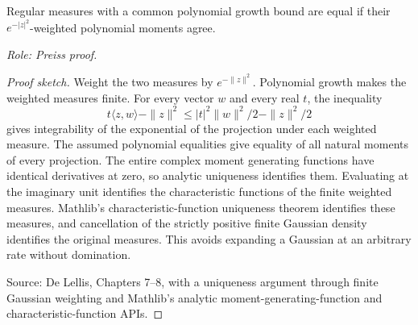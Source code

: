 \begin{lemma}
\label{lem:moment-determination}
Regular measures with a common polynomial growth bound are equal if their
$e^{-|z|^2}$-weighted polynomial moments agree.
\par\emph{Role: Preiss proof.}
\end{lemma}
\begin{proof}[Proof sketch]
Weight the two measures by $e^{-\|z\|^2}$. Polynomial growth makes the weighted measures finite. For every vector $w$ and every real $t$, the inequality
\[
t\langle z,w\rangle-\|z\|^2\leq |t|^2\|w\|^2/2-\|z\|^2/2
\]
gives integrability of the exponential of the projection under each weighted measure. The assumed polynomial equalities give equality of all natural moments of every projection. The entire complex moment generating functions have identical derivatives at zero, so analytic uniqueness identifies them. Evaluating at the imaginary unit identifies the characteristic functions of the finite weighted measures. Mathlib's characteristic-function uniqueness theorem identifies these measures, and cancellation of the strictly positive finite Gaussian density identifies the original measures. This avoids expanding a Gaussian at an arbitrary rate without domination.
\par Source: De Lellis, Chapters 7--8, with a uniqueness argument through finite Gaussian weighting and Mathlib's analytic moment-generating-function and characteristic-function APIs.
\end{proof}


